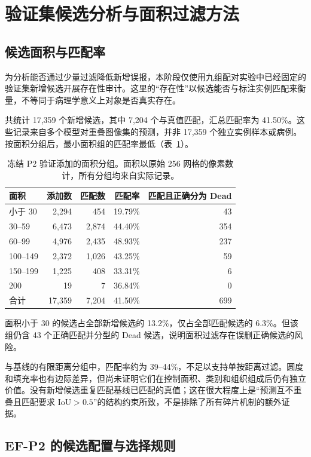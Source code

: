 \documentclass[11pt,a4paper,UTF8,fontset=fandol]{ctexart}
\begin{document}
\section{验证集候选分析与面积过滤方法}

\subsection{候选面积与匹配率}

为分析能否通过少量过滤降低新增误报，本阶段仅使用九组配对实验中已经固定的验证集新增候选开展存在性审计。这里的“存在性”以候选能否与标注实例匹配来衡量，不等同于病理学意义上对象是否真实存在。

共统计 17,359 个新增候选，其中 7,204 个与真值匹配，汇总匹配率为 41.50\%。这些记录来自多个模型对重叠图像集的预测，并非 17,359 个独立实例样本或病例。按面积分组后，最小面积组的匹配率最低（表~\ref{tab:area}）。

\begin{table}[H]
\centering\small
\caption{冻结 P2 验证添加的面积分组。面积以原始 256 网格的像素数计，所有分组均来自实际记录。}
\label{tab:area}
\begin{tabular}{lrrrr}\toprule
面积 & 添加数 & 匹配数 & 匹配率 & 匹配且正确分为 Dead\\\midrule
小于 30 & 2,294 & 454 & 19.79\% & 43\\
30--59 & 6,473 & 2,874 & 44.40\% & 354\\
60--99 & 4,976 & 2,435 & 48.93\% & 237\\
100--149 & 2,372 & 1,026 & 43.25\% & 59\\
150--199 & 1,225 & 408 & 33.31\% & 6\\
200 & 19 & 7 & 36.84\% & 0\\\midrule
合计 & 17,359 & 7,204 & 41.50\% & 699\\\bottomrule
\end{tabular}
\end{table}

面积小于 30 的候选占全部新增候选的 13.2\%，仅占全部匹配候选的 6.3\%。但该组仍含 43 个正确匹配并分型的 Dead 候选，说明面积过滤存在误删正确候选的风险。

与基线的有限距离分组中，匹配率约为 39--44\%，不足以支持单按距离过滤。圆度和填充率也有边际差异，但尚未证明它们在控制面积、类别和组织组成后仍有独立价值。没有新增候选重复匹配基线已匹配的真值；这在很大程度上是“预测互不重叠且匹配要求 IoU$>0.5$”的结构约束所致，不是排除了所有碎片机制的额外证据。

\subsection{EF-P2 的候选配置与选择规则}
\end{document}
